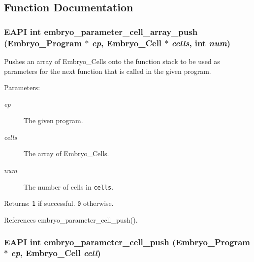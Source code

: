 \subsection{Function Documentation}
\hypertarget{group__Embryo__Parameter__Group_g3db70dbfb48a2792138d24cfff51d20c}{
\subsubsection{\setlength{\rightskip}{0pt plus 5cm}EAPI int embryo\_\-parameter\_\-cell\_\-array\_\-push (Embryo\_\-Program $\ast$ {\em ep}, \/  Embryo\_\-Cell $\ast$ {\em cells}, \/  int {\em num})}}
\label{group__Embryo__Parameter__Group_g3db70dbfb48a2792138d24cfff51d20c}


Pushes an array of Embryo\_\-Cells onto the function stack to be used as parameters for the next function that is called in the given program. 

\begin{Desc}
\item[Parameters:]
\begin{description}
\item[{\em ep}]The given program. \item[{\em cells}]The array of Embryo\_\-Cells. \item[{\em num}]The number of cells in {\tt cells}. \end{description}
\end{Desc}
\begin{Desc}
\item[Returns:]{\tt 1} if successful. {\tt 0} otherwise. \end{Desc}


References embryo\_\-parameter\_\-cell\_\-push().\hypertarget{group__Embryo__Parameter__Group_g1e0efa3807b52a3104eb229f7b389698}{
\subsubsection{\setlength{\rightskip}{0pt plus 5cm}EAPI int embryo\_\-parameter\_\-cell\_\-push (Embryo\_\-Program $\ast$ {\em ep}, \/  Embryo\_\-Cell {\em cell})}}
\label{group__Embryo__Parameter__Group_g1e0efa3807b52a3104eb229f7b389698}


